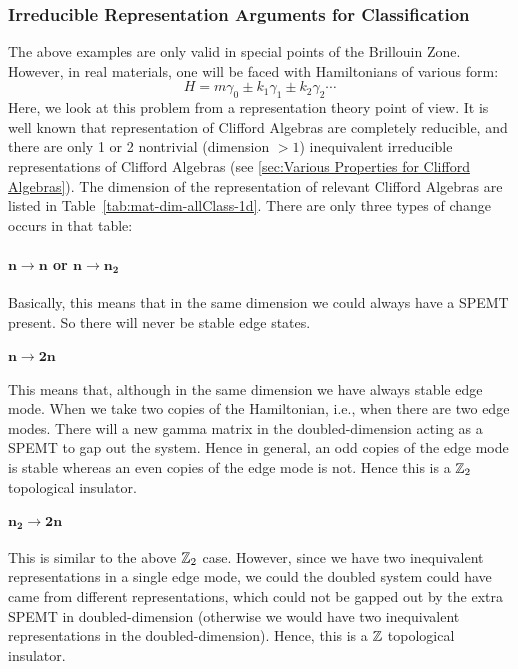 \documentclass{article}
\begin{document}
\subsubsection{Irreducible Representation Arguments for Classification}
\label{sec:Irreducible Representation Arguments for Classification}
The above examples are only valid in special points of the Brillouin Zone.
However, in real materials, one will be faced with Hamiltonians of various form:
\begin{equation}
    H = m\gamma_0 \pm k_1\gamma_1 \pm k_2\gamma_2 \cdots
\end{equation}
Here, we look at this problem from a representation theory point of view. It is
well known that representation of Clifford Algebras are completely reducible,
and there are only 1 or 2 nontrivial (dimension $>1$) inequivalent irreducible
representations of Clifford Algebras (see \ref{sec:Various Properties for
Clifford Algebras}).  The dimension of the representation of relevant Clifford
Algebras are listed in Table~\ref{tab:mat-dim-allClass-1d}. There are only three
types of change occurs in that table:

\paragraph{$\mathbf{n\to n}$ or $\mathbf{n\to n_2}$} Basically, this means that in the same
dimension we could always have a SPEMT present. So there will never be stable
edge states.

\paragraph{$\mathbf{n\to 2n}$} This means that, although in the same dimension we have
always stable edge mode. When we take two copies of the Hamiltonian, i.e., when
there are two edge modes. There will a new gamma matrix in the doubled-dimension
acting as a SPEMT to gap out the system. Hence in general, an odd copies of
the edge mode is stable whereas an even copies of the edge mode is not. Hence
this is a $\mathbb{Z}_2$ topological insulator.

\paragraph{$\mathbf{n_2\to 2n}$} This is similar to the above $\mathbb{Z}_2$ case. However, since
we have two inequivalent representations in a single edge mode, we could
the doubled system could have came from different representations, which could
not be gapped out by the extra SPEMT in doubled-dimension (otherwise we would
have two inequivalent representations in the doubled-dimension). Hence, this is
a $\mathbb{Z}$ topological insulator.
\end{document}
